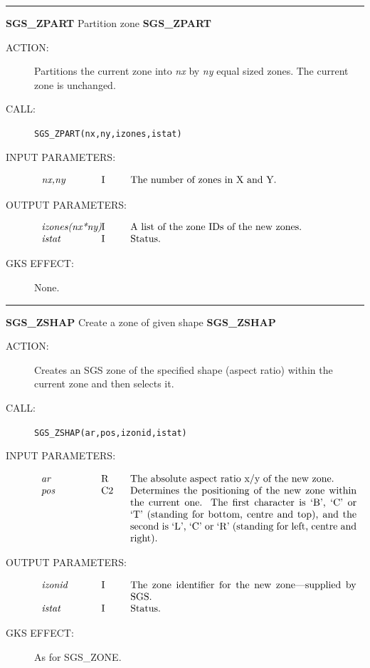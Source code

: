 \documentclass[11pt]{article}
\newcommand{\xlabel}[1]{}
\newcommand{\rthead}[2]{\rule{\textwidth}{0.3mm}
{\Large {\bf #1} \hfill #2 \hfill {\bf #1}}}
\newenvironment{params}%
{\[\begin{tabular}{p{0.14\textwidth}p{0.05\textwidth}p{0.66\textwidth}}}%
{\end{tabular}\]}
\newcommand{\rparams}[3]{{\em #1} &#2 &#3\\}
\newcommand{\rthead}[2]{\subsection{\label{#1}\xlabel{#1}#1 - #2}}
\newenvironment{params}{\begin{description}}{\end{description}}
\newcommand{\rparams}[3]{\item{{\em #1}} (#2) #3}
\begin{document}
\rthead{SGS\_ZPART}{Partition zone}
\begin{description}
\item [ACTION:]
Partitions the current zone into {\em nx}\/ by {\em ny}\/ equal sized zones.
The current zone is unchanged.
\item [CALL:]
{\tt SGS\_ZPART(nx,ny,izones,istat)}
\item [INPUT PARAMETERS:]
\begin{params}
\rparams{nx,ny}{I}{The number of zones in X and Y.}
\end{params}
\item [OUTPUT PARAMETERS:]
\begin{params}
\rparams{izones(nx*ny)}{I}{A list of the zone IDs of the new zones.}
\rparams{istat}{I}{Status.}
\end{params}
\item [GKS EFFECT:]
None.
\end{description}
\goodbreak

\rthead{SGS\_ZSHAP}{Create a zone of given shape}
\begin{description}
\item [ACTION:]
Creates an SGS zone of the specified shape (aspect ratio) within the current
zone and then selects it.
\item [CALL:]
{\tt SGS\_ZSHAP(ar,pos,izonid,istat)}
\item [INPUT PARAMETERS:]
\begin{params}
\rparams{ar}{R}{The absolute aspect ratio x/y of the new zone.}
\rparams{pos}{C2}{Determines the positioning of the new zone within the current
one. The first character is `B', `C' or `T' (standing for bottom, centre and 
top), and the second is `L', `C' or `R' (standing for left, centre and right).}
\end{params}
\item [OUTPUT PARAMETERS:]
\begin{params}
\rparams{izonid}{I}{The zone identifier for the new zone---supplied by SGS.}
\rparams{istat}{I}{Status.}
\end{params}
\item [GKS EFFECT:]
As for SGS\_ZONE.
\end{description}
\goodbreak
\end{document}
